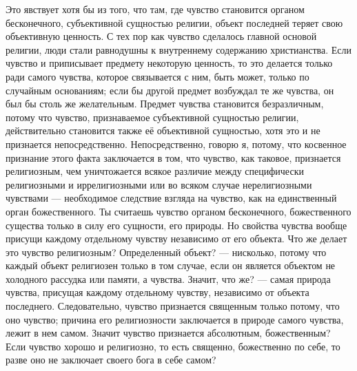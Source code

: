 \documentclass[12pt,oneside]{book}
\begin{document}
Это явствует хотя бы из того, что там, где чувство становится органом бесконечного, субъективной сущностью религии, объект последней теряет свою объективную ценность. С тех пор как чувство сделалось главной основой религии, люди стали равнодушны к внутреннему содержанию христианства. Если чувство и приписывает предмету некоторую ценность, то это делается только ради самого чувства, которое связывается с ним, быть может, только по случайным основаниям; если бы другой предмет возбуждал те же чувства, он был бы столь же желательным. Предмет чувства становится безразличным, потому что чувство, признаваемое субъективной сущностью религии, действительно становится также её объективной сущностью, хотя это и не признается непосредственно. Непосредственно, говорю я, потому, что косвенное признание этого факта заключается в том, что чувство, как таковое, признается религиозным, чем уничтожается всякое различие между специфически религиозными и иррелигиозными или во всяком случае нерелигиозными чувствами --- необходимое следствие взгляда на чувство, как на единственный орган божественного. Ты считаешь чувство органом бесконечного, божественного существа только в силу его сущности, его природы. Но свойства чувства вообще присущи каждому отдельному чувству независимо от его объекта. Что же делает это чувство религиозным? Определенный объект? --- нисколько, потому что каждый объект религиозен только в том случае, если он является объектом не холодного рассудка или памяти, а чувства. Значит, что же? --- самая природа чувства, присущая каждому отдельному чувству, независимо от объекта последнего. Следовательно, чувство признается священным только потому, что оно чувство; причина его религиозности заключается в природе самого чувства, лежит в нем самом. Значит чувство признается абсолютным, божественным? Если чувство хорошо и религиозно, то есть священно, божественно по себе, то разве оно не заключает своего бога в себе самом?
\end{document}
